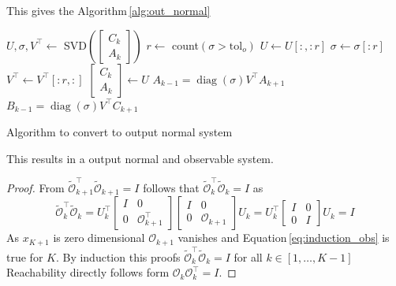 \documentclass[doctype=mastersthesis,BCOR=15mm,biblatex]{ldvbook}%
\DeclareMathOperator{\diag}{diag}
\newcommand{\Ob}{\mathcal{O}} %
\newcommand{\eye}{I} %
\begin{document}
\begin{itemize}
This gives the Algorithm\,\ref{alg:out_normal}
\begin{algorithm}[htb]
	\begin{algorithmic}
		\State $U,\sigma,V^\top \gets$ SVD$\left(\begin{bmatrix} C_k\\A_k \end{bmatrix}\right)$
		\State $r \gets $ count$(\sigma>\text{tol}_o)$
		\State $U \gets U[:,:r]$
		\State $\sigma \gets \sigma[:r]$
		\State $V^\top \gets V^\top[:r,:]$
		\State $\begin{bmatrix} C_k\\A_k \end{bmatrix} \gets U$
		\State $A_{k-1}=\diag(\sigma)V^\top A_{k+1}$
		\State $B_{k-1}=\diag(\sigma)V^\top C_{k+1}$
	\EndFor
	\end{algorithmic}
	\caption{Algorithm to convert to output normal system}\label{alg:out_normal}
\end{algorithm}
This results in a output normal and observable system.
\begin{proof}
	From $\tilde{\Ob}_{k+1}^\top\tilde{\Ob}_{k+1} = \eye$ follows that $\tilde{\Ob}_k^\top\tilde{\Ob}_k = \eye$ as
	\begin{equation}\label{eq:induction_obs}
		\tilde{\Ob}_k^\top\tilde{\Ob}_k
		=
		U_k^\top
		\begin{bmatrix} \eye& 0 \\
			0& \Ob_{k+1}^\top \end{bmatrix}
		\begin{bmatrix} \eye& 0 \\
		0& \Ob_{k+1} \end{bmatrix}
		U_k
		=
		U_k^\top
		\begin{bmatrix} \eye& 0 \\
		0& \eye \end{bmatrix}
		U_k
		=
		\eye
	\end{equation}
	As $x_{K+1}$ is zero dimensional $\Ob_{k+1}$ vanishes and Equation\,\ref{eq:induction_obs} is true for $K$.
	By induction this proofs $\tilde{\Ob}_k^\top\tilde{\Ob}_k = \eye$ for all $k \in [1,\dots,K-1]$
	Reachability directly follows form $\Ob_k\Ob_k^\top = \eye$.
\end{proof}



\end{itemize}
\end{document}
